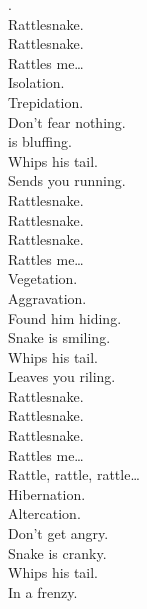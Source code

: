 
\label{album:flying-microtonal-banana}





. \\
Rattlesnake. \\
Rattlesnake. \\
Rattles me… \\

Isolation. \\
Trepidation. \\
Don't fear nothing. \\
 is bluffing. \\
Whips his tail. \\
Sends you running. \\

Rattlesnake. \\
Rattlesnake. \\
Rattlesnake. \\
Rattles me… \\

Vegetation. \\
Aggravation. \\
Found him hiding. \\
Snake is smiling. \\
Whips his tail. \\
Leaves you riling. \\

Rattlesnake. \\
Rattlesnake. \\
Rattlesnake. \\
Rattles me… \\

Rattle, rattle, rattle… \\

Hibernation. \\
Altercation. \\
Don't get angry. \\
Snake is cranky. \\
Whips his tail. \\
In a frenzy. \\

